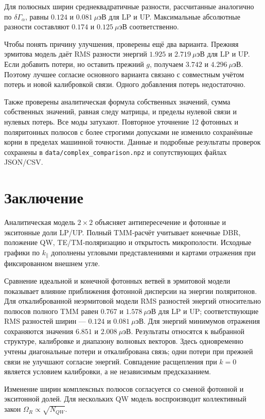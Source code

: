 \documentclass[12pt,a4paper]{article}
\begin{document}
Для полюсных ширин среднеквадратичные разности, рассчитанные аналогично по $\delta\Gamma_\alpha$, равны $0.124$ и $0.081\ \mu$эВ для LP и UP. Максимальные абсолютные разности составляют $0.174$ и $0.125\ \mu$эВ соответственно.

Чтобы понять причину улучшения, проверены ещё два варианта. Прежняя эрмитова модель даёт RMS разности энергий $1.925$ и $2.719\ \mu$эВ для LP и UP. Если добавить потери, но оставить прежний $g$, получаем $3.742$ и $4.296\ \mu$эВ. Поэтому лучшее согласие основного варианта связано с совместным учётом потерь и новой калибровкой связи. Одного добавления потерь недостаточно.

Также проверены аналитическая формула собственных значений, сумма собственных значений, равная следу матрицы, и пределы нулевой связи и нулевых потерь. Все моды затухают. Повторное уточнение 12 фотонных и поляритонных полюсов с более строгими допусками не изменило сохранённые корни в пределах машинной точности. Данные и подробные результаты проверок сохранены в \texttt{data/complex\_comparison.npz} и сопутствующих файлах JSON/CSV.

\clearpage
\section{Заключение}

Аналитическая модель $2\times2$ объясняет антипересечение и фотонные и
экситонные доли LP/UP. Полный TMM-расчёт учитывает конечные DBR, положение
QW, TE/TM-поляризацию и открытость микрополости. Исходные графики по
$k_\parallel$ дополнены угловыми представлениями и картами отражения при фиксированном
внешнем угле.

Сравнение идеальной и конечной фотонных ветвей в эрмитовой модели
показывает влияние приближения фотонной дисперсии на энергии поляритонов.
Для откалиб\-рованной неэрмитовой модели RMS разностей энергий относительно
полюсов полного TMM равен $0.767$ и $1.578\ \mu$эВ для LP и UP;
соответствующие RMS разностей ширин --- $0.124$ и $0.081\ \mu$эВ.
Для энергий минимумов отражения сохраняются значения $6.851$ и
$2.008\ \mu$эВ. Результаты относятся к выбранной структуре, калибровке
и диапазону волновых векторов. Здесь одновременно учтены диагональные
потери и откалибрована связь; одни потери при прежней связи не улучшают
согласие энергий. Совпадение расщепления при $k=0$ является условием
калибровки, а не независимым предсказанием.

Изменение ширин комплексных полюсов согласуется со сменой фотонной и
экситонной долей. Для нескольких QW модель воспроизводит коллективный закон
$\Omega_R\propto\sqrt{N_{QW}}$.
\end{document}
